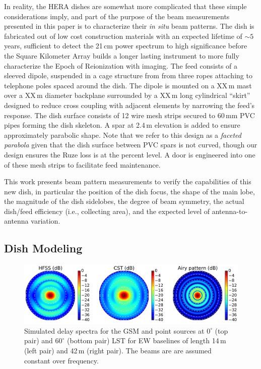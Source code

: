 \documentclass{emulateapj}
\begin{document}
In reality, the HERA dishes are somewhat more complicated that these simple considerations 
imply, and part of the purpose of the beam measurements presented in this paper is to 
characterize their \textit{in situ} beam patterns. The dish is fabricated out of low cost 
construction materials with an expected lifetime of $\sim5$ years, sufficient to detect the 21\,cm 
power spectrum to high significance before the Square Kilometer Array builds a longer lasting 
instrument to more fully characterize the Epoch of Reionization with imaging. The feed consists 
of a sleeved dipole, suspended in a cage structure from from three ropes attaching to telephone 
poles spaced around the dish. The dipole is mounted on a XX\,m mast over a XX\,m diameter backplane surrounded by a XX\,m long cylindrical ``skirt'' designed to reduce cross coupling with adjacent elements 
by narrowing the feed's response. The dish surface consists of 12 wire mesh strips secured to 
60\,mm PVC pipes forming the dish skeleton. A spar at 2.4\,m elevation is added to ensure 
approximately parabolic shape. Note that we refer to this design as a \textit{faceted parabola} 
given that the dish surface between PVC spars is not curved, though our design ensures the 
Ruze loss is at the percent level. A door is engineered into one of these mesh strips to facilitate 
feed maintenance.

This work presents beam pattern measurements to verify the capabilities of this new dish, in particular the 
position of the dish focus, the shape of the main lobe, the magnitude of the dish sidelobes, the 
degree of beam symmetry, the actual dish/feed efficiency (i.e., collecting area), and the expected level of antenna-to-antenna variation.

\subsection{Dish Modeling}
\label{sec:dishmodels}

\begin{figure}
\centering
\includegraphics[width=7in]{dave197_rich195_airy_beams.pdf}
\caption{Simulated delay spectra for the GSM and point sources at $0^\circ$ (top pair) and $60^\circ$ (bottom pair) LST for EW baselines of length 14\,m (left pair) and 42\,m (right pair). The beams are are assumed constant over frequency.}
\label{fig:delayspec}
\end{figure}
\end{document}
